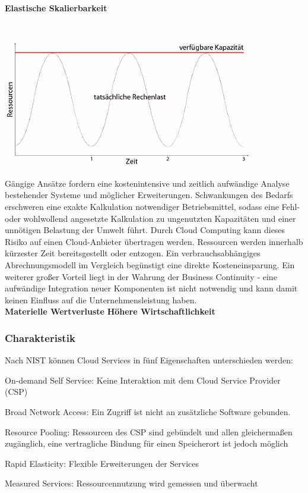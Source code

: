 \documentclass[12pt,a4paper,bibliography=totocnumbered,listof=totocnumbered]{scrartcl}
\begin{document}
\textbf{Elastische Skalierbarkeit}

\vspace{1em}
$\;$\\
\begin{minipage}{\linewidth}
	\centering
	\includegraphics[width=0.7\linewidth]{Auslastung.jpg}
\end{minipage}
\vspace{1em}

Gängige Ansätze fordern eine kostenintensive und zeitlich aufwändige Analyse bestehender Systeme und möglicher Erweiterungen. Schwankungen des Bedarfs erschweren eine exakte Kalkulation notwendiger Betriebsmittel, sodass eine Fehl- oder wohlwollend angesetzte Kalkulation zu ungenutzten Kapazitäten und einer unnötigen Belastung der Umwelt führt. Durch Cloud Computing kann dieses Risiko auf einen Cloud-Anbieter übertragen werden. Ressourcen werden innerhalb kürzester Zeit bereitsgestellt oder entzogen. Ein verbrauchsabhängiges Abrechnungsmodell im Vergleich begünstigt eine direkte Kosteneinsparung. Ein weiterer großer Vorteil liegt in der Wahrung der Business Continuity - eine aufwändige Integration neuer Komponenten ist nicht notwendig und kann damit keinen Einfluss auf die Unternehmensleistung haben.\\
\textbf{Materielle Wertverluste}
\textbf{Höhere Wirtschaftlichkeit}



\cite{33} \cite{39}

\subsubsection{Charakteristik}
Nach NIST \cite{34} können Cloud Services in fünf Eigenschaften unterschieden werden:
\begin{compactitem}
	\item On-demand Self Service: Keine Interaktion mit dem Cloud Service Provider (CSP)
	\item Broad Network Access: Ein Zugriff ist nicht an zusätzliche Software gebunden.
	\item Resource Pooling: Ressourcen des CSP sind gebündelt und allen gleichermaßen zugänglich, eine vertragliche Bindung für einen Speicherort ist jedoch möglich
	\item Rapid Elasticity: Flexible Erweiterungen der Services
	\item Measured Services: Ressourcennutzung wird gemessen und überwacht
\end{compactitem}
\end{document}
